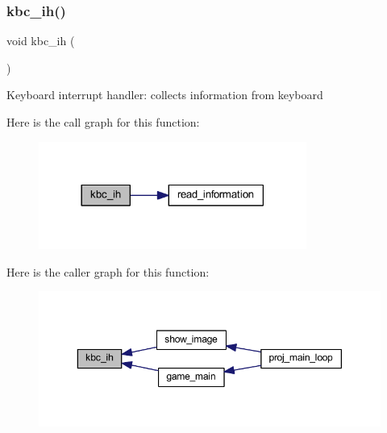\subsubsection{\texorpdfstring{kbc\+\_\+ih()}{kbc\_ih()}}
{\footnotesize\ttfamily void kbc\+\_\+ih (\begin{DoxyParamCaption}{ }\end{DoxyParamCaption})}




\begin{DoxyItemize}
\item Keyboard interrupt handler\+: collects information from keyboard 
\end{DoxyItemize}

Here is the call graph for this function\+:
\nopagebreak
\begin{figure}[H]
\begin{center}
\leavevmode
\includegraphics[width=249pt]{group__keyboard_gab9e6ed7960d60aa4834f2038247d4536_cgraph}
\end{center}
\end{figure}
Here is the caller graph for this function\+:
\nopagebreak
\begin{figure}[H]
\begin{center}
\leavevmode
\includegraphics[width=350pt]{group__keyboard_gab9e6ed7960d60aa4834f2038247d4536_icgraph}
\end{center}
\end{figure}
\mbox{\label{group__keyboard_gaa8e63a9750dae94729779940343f0150}} 
